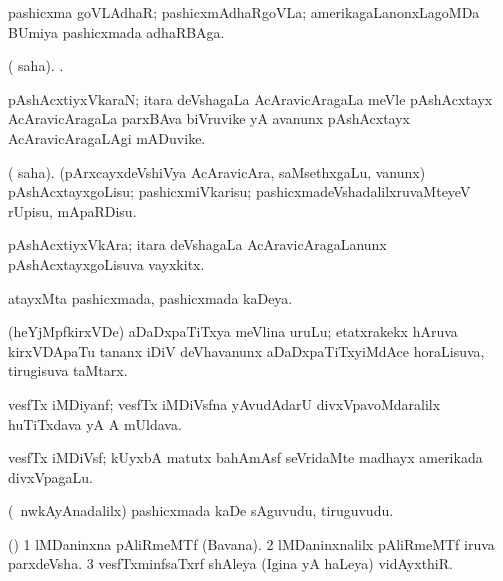 {{{{{{\bentry
{} 
\gl{\nA}
\expl{}
\bmng
pashicxma goVLAdhaR; pashicxmAdhaRgoVLa; amerikagaLanonxLagoMDa BUmiya pashicxmada adhaRBAga. 
\emng
\eentry

\bentry
{} 
\gl{\sakirx}
\expl{}
\bmng
( saha). . 
\emng
\eentry

\bentry
{} 
\gl{\nA}
\expl{}
\bmng
pAshAcxtiyxVkaraN; itara deVshagaLa AcAravicAragaLa meVle pAshAcxtayx AcAravicAragaLa parxBAva biVruvike yA avanunx pAshAcxtayx AcAravicAragaLAgi mADuvike. 
\emng
\eentry

\bentry
{} 
\gl{\sakirx}
\expl{}
\bmng
( saha). (pArxcayxdeVshiVya AcAravicAra, saMsethxgaLu, \mo vanunx) pAshAcxtayxgoLisu; pashicxmiVkarisu; pashicxmadeVshadalilxruvaMteyeV rUpisu, mApaRDisu. 
\emng
\eentry

\bentry
{} 
\gl{\nA}
\expl{}
\bmng
pAshAcxtiyxVkAra; itara deVshagaLa AcAravicAragaLanunx pAshAcxtayxgoLisuva vayxkitx. 
\emng
\eentry

\bentry
{} 
\gl{\gu}
\expl{}
\bmng
atayxMta pashicxmada, pashicxmada kaDeya. 
\emng
\eentry

\bentry
{} 
\gl{\nA}
\expl{}
\bmng
(heYjMpfkirxVDe) aDaDxpaTiTxya meVlina uruLu; etatxrakekx hAruva kirxVDApaTu tananx iDiV deVhavanunx aDaDxpaTiTxyiMdAce horaLisuva, tirugisuva taMtarx. 
\emng
\eentry

\bentry
{} 
\gl{\nA}
\expl{}
\bmng
vesfTx iMDiyanf; vesfTx iMDiVsfna yAvudAdarU divxVpavoMdaralilx huTiTxdava yA A mUldava. 
\emng
\eentry

\bentry
{} 
\gl{\nA}
\expl{}
\bmng
vesfTx iMDiVsf; kUyxbA matutx bahAmAsf seVridaMte madhayx amerikada divxVpagaLu. 
\emng
\eentry

\bentry
{} 
\gl{\nA}
\expl{}
\bmng
(\kanmu\ nwkAyAnadalilx) pashicxmada kaDe sAguvudu, tiruguvudu. 
\emng
\eentry

\bentry
{} 
\gl{\nA}
\expl{}
\bmng
(\birx) 
\bnum
\num{1} lMDaninxna pAliRmeMTf (Bavana). 
\num{2} lMDaninxnalilx pAliRmeMTf iruva parxdeVsha. 
\num{3} vesfTxminfsaTxrf shAleya (Igina yA haLeya) vidAyxthiR. 
\enum
\emng
\eentry

}}}}}}
